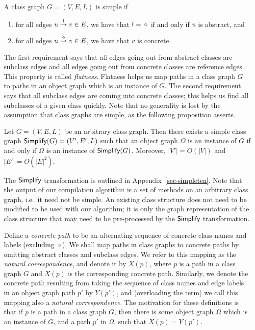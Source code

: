 \begin{definition}
\label{def-simple}
A class graph $G=(V,E,L)$ is {\sf simple} if 
\begin{enumerate}
\item for all edges $u\stackrel{l}{\rightarrow}v \in E$, we have that $l=\diamond$ if
      and only if $u$ is abstract, and
\item for all edges $u\stackrel{\diamond}{\rightarrow}v \in E$, we have that $v$ is concrete.
\end{enumerate}
\end{definition}
%
The first requirement says that all edges going out from abstract
classes are subclass edges and all edges going out from concrete
classes are reference edges.  This property is called {\em flatness}.
Flatness helps us map paths in a class graph $G$ to paths in an object
graph which is an instance of $G$. The second requirement says that
all subclass edges are coming into concrete classes; this helps us
find all subclasses of a given class quickly.  Note that no generality
is lost by the assumption that class graphs are simple, as the
following proposition asserts.
%
\begin{proposition}
\label{prop-simple}
Let $G=(V,E,L)$ be an arbitrary class graph. Then there exists a
simple class graph $\mbox{\sf Simplify}(G)=(V',E',L)$ such that an object graph
$\Omega$ is an instance of $G$ if and only if $\Omega$ is an instance
of $\mbox{\sf Simplify}(G)$. Moreover, $|V'|=O(|V|)$ and $|E'|=O(|E|^2)$.
\end{proposition}
The $\mbox{\sf Simplify}$ transformation is outlined in Appendix~\ref{sec-simpleten}.
Note that the output of our compilation algorithm is a set of methods
on an arbitrary class graph, i.e.~it need not be simple.  An existing
class structure does not need to be modified to be used with our
algorithm; it is only the graph representation of the class structure
that may need to be pre-processed by the $\mbox{\sf Simplify}$ transformation.

Define a {\em concrete path} to be an alternating sequence of concrete
class names and labels (excluding $\diamond$).  We shall map paths in
class graphs to concrete paths by omitting abstract classes and
subclass edges.  We refer to this mapping as the {\em natural
correspondence}, and denote it by $X(p)$, where $p$ is a path in a
class graph $G$ and $X(p)$ is the corresponding concrete path.
Similarly, we denote the concrete path resulting from taking the
sequence of class names and edge labels in an object graph path $p'$
by $Y(p')$, and (overloading the term) we call this mapping also a
{\em natural correspondence}.  The motivation for these definitions is
that if $p$ is a path in a class graph $G$, then there is some object
graph $\Omega$ which is an instance of $G$, and a path $p'$ in
$\Omega$, such that $X(p)=Y(p')$.


